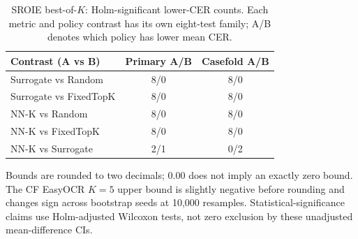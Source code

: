 \begin{table}[H]
\centering
\caption{SROIE best-of-$K$: Holm-significant lower-CER counts. Each metric and policy contrast has its own eight-test family; A/B denotes which policy has lower mean CER.}
\label{tab:sroie_casefold_counts}
\small
\begin{tabular}{lcc}
\toprule
Contrast (A vs B) & Primary A/B & Casefold A/B \\
\midrule
Surrogate vs Random & 8/0 & 8/0 \\
Surrogate vs FixedTopK & 8/0 & 8/0 \\
NN-K vs Random & 8/0 & 8/0 \\
NN-K vs FixedTopK & 8/0 & 8/0 \\
NN-K vs Surrogate & 2/1 & 0/2 \\
\bottomrule
\end{tabular}
\end{table}

\begin{table}[H]
\centering
\caption{NN-K minus Surrogate on SROIE (CER percentage points). CS: primary case-sensitive metric; CF: casefold. CIs are paired percentile bootstrap 95\% intervals per comparison, not multiplicity-adjusted; $p_H$ is Holm-adjusted separately within each metric's eight-test family.}
\label{tab:sroie_casefold_nn}
\small
{}
\par\smallskip\begin{minipage}{\textwidth}\footnotesize Bounds are rounded to two decimals; 0.00 does not imply an exactly zero bound. The CF EasyOCR $K=5$ upper bound is slightly negative before rounding and changes sign across bootstrap seeds at 10,000 resamples. Statistical-significance claims use Holm-adjusted Wilcoxon tests, not zero exclusion by these unadjusted mean-difference CIs.\end{minipage}
\end{table}
